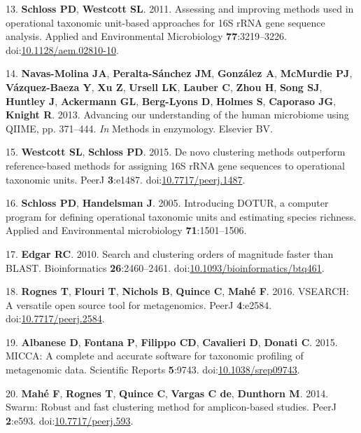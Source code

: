 \documentclass[11pt,]{article}
\begin{document}
\hypertarget{ref-Schloss2011}{}
13. \textbf{Schloss PD}, \textbf{Westcott SL}. 2011. Assessing and
improving methods used in operational taxonomic unit-based approaches
for 16S rRNA gene sequence analysis. Applied and Environmental
Microbiology \textbf{77}:3219--3226.
doi:\href{https://doi.org/10.1128/aem.02810-10}{10.1128/aem.02810-10}.

\hypertarget{ref-NavasMolina2013}{}
14. \textbf{Navas-Molina JA}, \textbf{Peralta-Sánchez JM},
\textbf{González A}, \textbf{McMurdie PJ}, \textbf{Vázquez-Baeza Y},
\textbf{Xu Z}, \textbf{Ursell LK}, \textbf{Lauber C}, \textbf{Zhou H},
\textbf{Song SJ}, \textbf{Huntley J}, \textbf{Ackermann GL},
\textbf{Berg-Lyons D}, \textbf{Holmes S}, \textbf{Caporaso JG},
\textbf{Knight R}. 2013. Advancing our understanding of the human
microbiome using QIIME, pp. 371--444. \emph{In} Methods in enzymology.
Elsevier BV.

\hypertarget{ref-Westcott2015}{}
15. \textbf{Westcott SL}, \textbf{Schloss PD}. 2015. De novo clustering
methods outperform reference-based methods for assigning 16S rRNA gene
sequences to operational taxonomic units. PeerJ \textbf{3}:e1487.
doi:\href{https://doi.org/10.7717/peerj.1487}{10.7717/peerj.1487}.

\hypertarget{ref-Schloss2005}{}
16. \textbf{Schloss PD}, \textbf{Handelsman J}. 2005. Introducing DOTUR,
a computer program for defining operational taxonomic units and
estimating species richness. Applied and Environmental microbiology
\textbf{71}:1501--1506.

\hypertarget{ref-Edgar2010}{}
17. \textbf{Edgar RC}. 2010. Search and clustering orders of magnitude
faster than BLAST. Bioinformatics \textbf{26}:2460--2461.
doi:\href{https://doi.org/10.1093/bioinformatics/btq461}{10.1093/bioinformatics/btq461}.

\hypertarget{ref-Rognes2016}{}
18. \textbf{Rognes T}, \textbf{Flouri T}, \textbf{Nichols B},
\textbf{Quince C}, \textbf{Mahé F}. 2016. VSEARCH: A versatile open
source tool for metagenomics. PeerJ \textbf{4}:e2584.
doi:\href{https://doi.org/10.7717/peerj.2584}{10.7717/peerj.2584}.

\hypertarget{ref-Albanese2015}{}
19. \textbf{Albanese D}, \textbf{Fontana P}, \textbf{Filippo CD},
\textbf{Cavalieri D}, \textbf{Donati C}. 2015. MICCA: A complete and
accurate software for taxonomic profiling of metagenomic data.
Scientific Reports \textbf{5}:9743.
doi:\href{https://doi.org/10.1038/srep09743}{10.1038/srep09743}.

\hypertarget{ref-Mah2014}{}
20. \textbf{Mahé F}, \textbf{Rognes T}, \textbf{Quince C},
\textbf{Vargas C de}, \textbf{Dunthorn M}. 2014. Swarm: Robust and fast
clustering method for amplicon-based studies. PeerJ \textbf{2}:e593.
doi:\href{https://doi.org/10.7717/peerj.593}{10.7717/peerj.593}.
\end{document}
